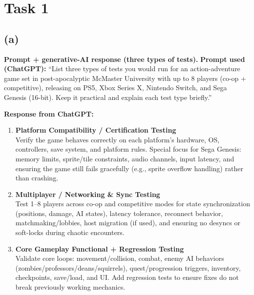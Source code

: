 \section{Task 1}

\subsection{(a)}
\textbf{Prompt + generative-AI response (three types of tests).}
\textbf{Prompt used (ChatGPT):} ``List three types of tests you would run for an action-adventure game set in post-apocalyptic McMaster University with up to 8 players (co-op + competitive), releasing on PS5, Xbox Series X, Nintendo Switch, and Sega Genesis (16-bit). Keep it practical and explain each test type briefly.''

\textbf{Response from ChatGPT:}
\begin{enumerate}
    \item \textbf{Platform Compatibility / Certification Testing} \\
    Verify the game behaves correctly on each platform's hardware, OS, controllers, save system, and platform rules. Special focus for Sega Genesis: memory limits, sprite/tile constraints, audio channels, input latency, and ensuring the game still fails gracefully (e.g., sprite overflow handling) rather than crashing.

    \item \textbf{Multiplayer / Networking \& Sync Testing} \\
    Test 1--8 players across co-op and competitive modes for state synchronization (positions, damage, AI states), latency tolerance, reconnect behavior, matchmaking/lobbies, host migration (if used), and ensuring no desyncs or soft-locks during chaotic encounters.

    \item \textbf{Core Gameplay Functional + Regression Testing} \\
    Validate core loops: movement/collision, combat, enemy AI behaviors (zombies/professors/deans/squirrels), quest/progression triggers, inventory, checkpoints, save/load, and UI. Add regression tests to ensure fixes do not break previously working mechanics.
\end{enumerate}

